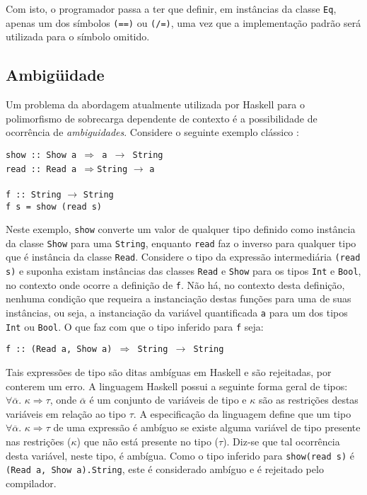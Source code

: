 Com isto, o programador passa a ter que definir, em inst\^ancias da classe \texttt{Eq}, 
apenas um dos s\'imbolos \texttt{(==)} ou \texttt{(/=)}, uma vez que a implementa\c{c}\~ao 
padr\~ao ser\'a utilizada para o s\'imbolo omitido.

\subsection{Ambig\"uidade}\label{amb}

Um problema da abordagem atualmente utilizada por Haskell para o polimorfismo de sobrecarga dependente 
de contexto \'e a possibilidade de ocorr\^encia de \emph{ambiguidades}. Considere o seguinte exemplo cl\'assico 
\cite{Haskell98,Haskell07}:
\begin{flushleft}
   \verb|show :: Show a |$\Rightarrow$\verb| a |$\rightarrow$\verb| String|\\
   \verb|read :: Read a |$\Rightarrow$\verb|String| $\rightarrow$ \verb|a|\\
   \verb| |\\
   \verb|f :: String| $\rightarrow$ \verb|String|\\
   \verb|f s = show (read s)|
\end{flushleft}

Neste exemplo, \texttt{show} converte um valor de qualquer tipo definido como inst\^ancia da classe 
\texttt{Show} para uma \texttt{String}, enquanto \texttt{read} faz o inverso para qualquer 
tipo que \'e inst\^ancia da classe \texttt{Read}. Considere o tipo da express\~ao intermedi\'aria 
\texttt{(read s)} e suponha existam inst\^ancias das classes \texttt{Read} e \texttt{Show} para os tipos \texttt{Int} 
e \texttt{Bool}, no contexto onde ocorre a defini\c{c}\~ao de \texttt{f}. N\~ao h\'a, no contexto desta defini\c{c}\~ao,
nenhuma condi\c{c}\~ao que requeira a instancia\c{c}\~ao destas fun\c{c}\~oes para uma de suas inst\^ancias, ou seja,
a instancia\c{c}\~ao da vari\'avel quantificada \texttt{a} para um dos tipos \texttt{Int} ou \texttt{Bool}. O que faz 
com que o tipo inferido para \texttt{f} seja: 
\begin{center}
	\texttt{f :: (Read a, Show a) $\Rightarrow$ String $\rightarrow$ String}
\end{center}
Tais express\~oes de tipo s\~ao ditas amb\'iguas em Haskell e s\~ao rejeitadas, por conterem um erro. 
A linguagem Haskell possui a seguinte forma geral de tipos: $\forall\overline{\alpha} .\,\,\kappa\Rightarrow \tau$,
onde $\overline{\alpha}$ \'e um conjunto de vari\'aveis de tipo e $\kappa$ s\~ao as restri\c{c}\~oes destas 
vari\'aveis em rela\c{c}\~ao ao tipo $\tau$. A especifica\c{c}\~ao da linguagem define que um tipo 
$\forall\overline{\alpha} .\,\,\kappa\Rightarrow \tau$ de  
uma express\~ao \'e amb\'iguo se existe alguma vari\'avel de tipo presente nas restri\c{c}\~oes
($\kappa$) que n\~ao est\'a presente no tipo ($\tau$). Diz-se que tal ocorr\^encia desta vari\'avel, neste 
tipo, \'e amb\'igua. Como o tipo inferido para \texttt{show(read s)} \'e 
\texttt{(Read a, Show a).String}, este \'e considerado amb\'iguo e \'e rejeitado 
pelo compilador.

